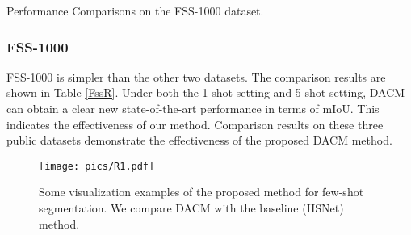 \documentclass[runningheads]{llncs}
\begin{document}
\begin{table}[tbp]
\parbox{.45\linewidth}{
\caption{Performance Comparisons on the FSS-1000 dataset.}
\label{FssR}
\centering
{}
}
\hfill
\parbox{.45\linewidth}{
\caption{Ablation study on PASCAL- dataset.}\label{abpas}
\centering
{}
}
\end{table}
\subsubsection{FSS-1000}
FSS-1000 is simpler than the other two datasets. The comparison results are shown in Table \ref{FssR}. Under both the 1-shot setting and 5-shot setting, DACM can obtain a clear new state-of-the-art performance in terms of mIoU. This indicates the effectiveness of our method. Comparison results on these three public datasets demonstrate the effectiveness of the proposed DACM method.
\begin{figure}[t]
	\centering
	\texttt{[image: pics/R1.pdf]}
	\caption{Some visualization examples of the proposed method for few-shot segmentation. We compare DACM with the baseline (HSNet) method.
}
	\label{R1}
\end{figure} 
\end{document}

